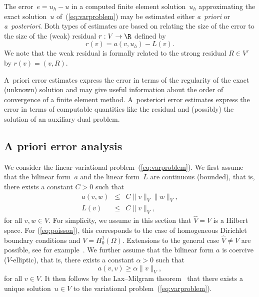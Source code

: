 The error~$e = u_h - u$ in a computed finite element solution~$u_h$
approximating the exact solution~$u$ of~(\ref{eq:varproblem}) may be
estimated either \emph{a~priori} or \emph{a~posteriori}. Both types of
estimates are based on relating the size of the error to the size of
the (weak) residual $r : V \rightarrow \R$ defined by
\begin{equation} \label{eq:residual,weak}
  r(v) = a(v, u_h) - L(v).
\end{equation}
We note that the weak residual is formally related to the strong
residual $R \in V'$ by $r(v) = (v, R)$.

A~priori error estimates express the error in terms of the regularity
of the exact (unknown) solution and may give useful information about
the order of convergence of a finite element method. A~posteriori
error estimates express the error in terms of computable quantities
like the residual and (possibly) the solution of an auxiliary dual
problem.

\subsection{A priori error analysis}

We consider the linear variational problem~(\ref{eq:varproblem}). We
first assume that the bilinear form~$a$ and the linear form~$L$ are
continuous (bounded), that is, there exists a constant $C > 0$ such
that
\begin{eqnarray} \label{eq:continuity}
  a(v, w) &\leq& C \|v\|_V \|w\|_V, \\
  L(v) &\leq& C \|v\|_V,
\end{eqnarray}
for all $v, w \in V$. For simplicity, we assume in this section that
$\hat{V} = V$ is a Hilbert space. For (\ref{eq:poisson}), this
corresponds to the case of homogeneous Dirichlet boundary conditions
and $V = H^1_0(\Omega)$. Extensions to the general case $\hat{V} \neq
V$ are possible, see for example~\cite{OdenDemkowicz1996}. We further
assume that the bilinear form $a$ is coercive ($V$-elliptic), that is,
there exists a constant $\alpha > 0$ such that
\begin{equation} \label{eq:coercivity}
  a(v, v) \geq \alpha \|v\|_V,
\end{equation}
for all $v \in V$. It then follows by the Lax--Milgram
theorem~\cite{LaxMilgram1954} that there exists a unique solution~$u
\in V$ to the variational problem~(\ref{eq:varproblem}).

